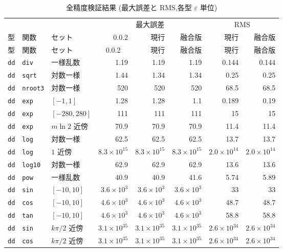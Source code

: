 \documentclass[a4paper,10pt]{ltjsarticle}
\begin{document}
\begingroup
\small
\setlength{\tabcolsep}{4pt}
\begin{longtable}{lll rrr rr}
\caption{全精度検証結果 (最大誤差と RMS,各型 $\varepsilon$ 単位)}
\label{tab:accfull} \\
\toprule
 & & & \multicolumn{3}{c}{最大誤差} & \multicolumn{2}{c}{RMS} \\
\cmidrule(lr){4-6} \cmidrule(lr){7-8}
型 & 関数 & セット & 0.0.2 & 現行 & 融合版 & 現行 & 融合版 \\
\midrule
\endfirsthead
\toprule
型 & 関数 & セット & \multicolumn{1}{c}{0.0.2} & 現行 & 融合版 & 現行 & 融合版 \\
\midrule
\endhead
\bottomrule
\endfoot
\texttt{dd} & \texttt{div} & 一様乱数 & 1.19 & 1.19 & 1.19 & 0.144 & 0.144 \\
\texttt{dd} & \texttt{sqrt} & 対数一様 & 1.44 & 1.34 & 1.34 & 0.25 & 0.25 \\
\texttt{dd} & \texttt{nroot3} & 対数一様 & 520 & 520 & 520 & 68.5 & 68.5 \\
\texttt{dd} & \texttt{exp} & $[-1,1]$ & 1.28 & 1.28 & 1.1 & 0.189 & 0.19 \\
\texttt{dd} & \texttt{exp} & $[-280,280]$ & 111 & 111 & 111 & 15 & 15 \\
\texttt{dd} & \texttt{exp} & $m\ln 2$ 近傍 & 70.9 & 70.9 & 70.9 & 11.4 & 11.4 \\
\texttt{dd} & \texttt{log} & 対数一様 & 62.5 & 62.5 & 62.5 & 13.7 & 13.7 \\
\texttt{dd} & \texttt{log} & $1$ 近傍 & $8.3\times10^{15}$ & $8.3\times10^{15}$ & $8.3\times10^{15}$ & $2.0\times10^{14}$ & $2.0\times10^{14}$ \\
\texttt{dd} & \texttt{log10} & 対数一様 & 62.9 & 62.9 & 62.9 & 13.6 & 13.6 \\
\texttt{dd} & \texttt{pow} & 一様乱数 & 40.9 & 40.9 & 41.6 & 5.74 & 5.89 \\
\texttt{dd} & \texttt{sin} & $[-10,10]$ & $3.6\times10^{3}$ & $3.6\times10^{3}$ & $3.6\times10^{3}$ & 33 & 33 \\
\texttt{dd} & \texttt{cos} & $[-10,10]$ & $4.6\times10^{3}$ & $4.6\times10^{3}$ & $4.6\times10^{3}$ & 48.7 & 48.7 \\
\texttt{dd} & \texttt{tan} & $[-10,10]$ & $4.6\times10^{3}$ & $4.6\times10^{3}$ & $4.6\times10^{3}$ & 58.8 & 58.8 \\
\texttt{dd} & \texttt{sin} & $k\pi/2$ 近傍 & $3.1\times10^{35}$ & $3.1\times10^{35}$ & $3.1\times10^{35}$ & $2.6\times10^{34}$ & $2.6\times10^{34}$ \\
\texttt{dd} & \texttt{cos} & $k\pi/2$ 近傍 & $3.1\times10^{35}$ & $3.1\times10^{35}$ & $3.1\times10^{35}$ & $2.6\times10^{34}$ & $2.6\times10^{34}$ \\

\end{longtable}
\end{document}
